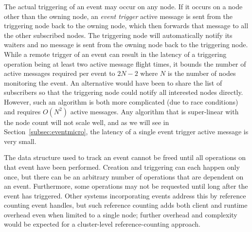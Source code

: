 The actual triggering of an event may occur on any node.  If it occurs on a node other than the owning
node, an {\em event trigger} active message is sent from the triggering node back to the owning node, which
then forwards that message to all the other subscribed nodes.  The triggering node will automatically
notify its waiters and no message is sent from the owning node back to the triggering node.
While a remote trigger of an event can result in
the latency of a triggering operation being at least two active message flight times, it bounds the number of active
messages required per event to $2N-2$ where $N$ is the number of nodes 
monitoring the event.  An alternative
would have been to share the list of subscribers so that the triggering node could notify all interested
nodes directly.  However, such an algorithm is both more complicated (due to race conditions) and requires $O(N^2)$
active messages.  Any algorithm that is super-linear with the node count will not scale well, 
and as we will see in Section~\ref{subsec:eventmicro}, the latency of a single event trigger
active message is very small. 

The data structure used to track an event cannot be freed until all operations on that event have been
performed.  Creation and triggering can each happen only once, but there can be an arbitrary number of operations
that are dependent on an event.   Furthermore, some operations may not be requested until long after the
event has triggered.  Other systems incorporating events address this by reference counting event
handles\cite{Khronos:OpenCL}, but such reference counting adds both client and runtime overhead even when
limited to a single node; further overhead and complexity would be expected for a cluster-level
reference-counting approach.

